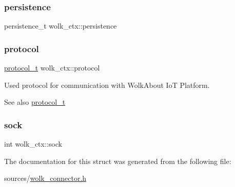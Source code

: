 \mbox{\label{structwolk__ctx_a9d7d83e339fcd632b0679db3f86b4293}} 
\subsubsection{\texorpdfstring{persistence}{persistence}}
{\footnotesize\ttfamily persistence\+\_\+t wolk\+\_\+ctx\+::persistence}

\mbox{\label{structwolk__ctx_af93f257ff60dd00f34455d425207e66f}} 
\subsubsection{\texorpdfstring{protocol}{protocol}}
{\footnotesize\ttfamily \hyperlink{wolk__connector_8h_a91e19fa4fff461493e1a41f7c7aa4e5f}{protocol\+\_\+t} wolk\+\_\+ctx\+::protocol}

Used protocol for communication with Wolk\+About IoT Platform. \begin{DoxySeeAlso}{See also}
\hyperlink{wolk__connector_8h_a91e19fa4fff461493e1a41f7c7aa4e5f}{protocol\+\_\+t} 
\end{DoxySeeAlso}
\mbox{\label{structwolk__ctx_a7b2318c99408cdafb7ede7f5d472e100}} 
\subsubsection{\texorpdfstring{sock}{sock}}
{\footnotesize\ttfamily int wolk\+\_\+ctx\+::sock}



The documentation for this struct was generated from the following file\+:\begin{DoxyCompactItemize}
\item 
sources/\hyperlink{wolk__connector_8h}{wolk\+\_\+connector.\+h}\end{DoxyCompactItemize}
